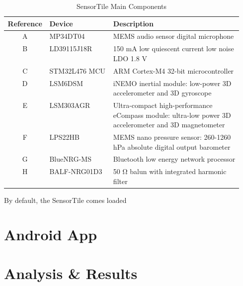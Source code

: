 \begin{table}[H]
\centering
\begin{tabular}{@{}|c|l|p{0.55\linewidth}|@{}}
\hline
\toprule
{\bf Reference} & {\bf Device} & {\bf Description} \\ \hline
\midrule
A & MP34DT04      & MEMS audio sensor digital microphone \\ \hline
B & LD39115J18R   & 150 mA low quiescent current low noise LDO 1.8 V \\ \hline
C & STM32L476 MCU & ARM Cortex-M4 32-bit microcontroller \\ \hline
D & LSM6DSM       & iNEMO inertial module: low-power 3D accelerometer and 3D gyroscope \\ \hline
E & LSM303AGR     & Ultra-compact high-performance eCompass module: ultra-low power 3D accelerometer and 3D magnetometer \\ \hline
F & LPS22HB       & MEMS nano pressure sensor: 260-1260 hPa absolute digital output barometer \\ \hline
G & BlueNRG-MS    & Bluetooth low energy network processor \\ \hline
H & BALF-NRG01D3  & 50 Ω balun with integrated harmonic filter \\ \hline
\bottomrule
\end{tabular}
\caption{SensorTile Main Components}
\label{table:sensortile}
\end{table}

\newpage

By default, the SensorTile comes loaded

\newpage
\section{Android App}
\lipsum[1]

\newpage
\section{Analysis \& Results}
\lipsum[1]
